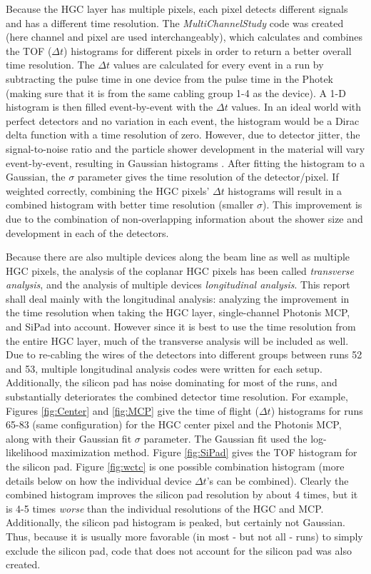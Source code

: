 \documentclass[12pt]{article}
\begin{document}
Because the HGC layer has multiple pixels, each pixel detects different signals and has a different time resolution. 
The \textit{MultiChannelStudy} code was created (here channel and pixel are used interchangeably), which calculates and combines the TOF ($\Delta t$) histograms for different pixels in order to return a better overall time resolution. 
The $\Delta t$ values are calculated for every event in a run by subtracting the pulse time in one device from the pulse time in the Photek (making sure that it is from the same cabling group 1-4 as the device). 
A 1-D histogram is then filled event-by-event with the $\Delta t$ values. 
In an ideal world with perfect detectors and no variation in each event, the histogram would be a Dirac delta function with a time resolution of zero. 
However, due to detector jitter, the signal-to-noise ratio and the particle shower development in the material will vary event-by-event, resulting in Gaussian histograms \cite{P2}. 
After fitting the histogram to a Gaussian, the $\sigma$ parameter gives the time resolution of the detector/pixel. 
If weighted correctly, combining the HGC pixels’ $\Delta t$ histograms will result in a combined histogram with better time resolution (smaller $\sigma$). 
This improvement is due to the combination of non-overlapping information about the shower size and development in each of the detectors.

Because there are also multiple devices along the beam line as well as multiple HGC pixels, the analysis of the coplanar HGC pixels has been called \textit{transverse analysis}, and the analysis of multiple devices \textit{longitudinal analysis}. 
This report shall deal mainly with the longitudinal analysis: analyzing the improvement in the time resolution when taking the HGC layer, single-channel Photonis MCP, and SiPad into account. 
However since it is best to use the time resolution from the entire HGC layer, much of the transverse analysis will be included as well. 
Due to re-cabling the wires of the detectors into different groups between runs 52 and 53, multiple longitudinal analysis codes were written for each setup. 
Additionally, the silicon pad has noise dominating for most of the runs, and substantially deteriorates the combined detector time resolution. 
For example, Figures \ref{fig:Center} and \ref{fig:MCP} give the time of flight ($\Delta t$) histograms for runs 65-83 (same configuration) for the HGC center pixel and the Photonis MCP, along with their Gaussian fit $\sigma$ parameter. 
The Gaussian fit used the log-likelihood maximization method.
Figure \ref{fig:SiPad} gives the TOF histogram for the silicon pad. 
Figure \ref{fig:wctc} is one possible combination histogram (more details below on how the individual device $\Delta t$'s can be combined). 
Clearly the combined histogram improves the silicon pad resolution by about 4 times, but it is 4-5 times \textit{worse} than the individual resolutions of the HGC and MCP. 
Additionally, the silicon pad histogram is peaked, but certainly not Gaussian. 
Thus, because it is usually more favorable (in most - but not all - runs) to simply exclude the silicon pad, code that does not account for the silicon pad was also created.
\end{document}
